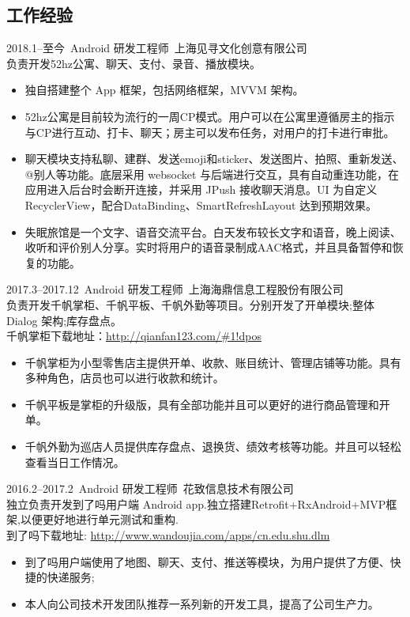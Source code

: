 \documentclass[11pt]{res}
\begin{document}
\begin{resume}
\section{工作经验}
  2018.1--至今\ Android 研发工程师\ 上海见寻文化创意有限公司\\负责开发52hz公寓、聊天、支付、录音、播放模块。
  \begin{itemize}
    \item 独自搭建整个 App 框架，包括网络框架，MVVM 架构。 
    \item 52hz公寓是目前较为流行的一周CP模式。用户可以在公寓里遵循房主的指示与CP进行互动、打卡、聊天；房主可以发布任务，对用户的打卡进行审批。
    \item 聊天模块支持私聊、建群、发送emoji和sticker、发送图片、拍照、重新发送、@别人等功能。底层采用 websocket 与后端进行交互，具有自动重连功能，在应用进入后台时会断开连接，并采用 JPush 接收聊天消息。UI 为自定义 RecyclerView，配合DataBinding、SmartRefreshLayout 达到预期效果。
    \item 失眠旅馆是一个文字、语音交流平台。白天发布较长文字和语音，晚上阅读、收听和评价别人分享。实时将用户的语音录制成AAC格式，并且具备暂停和恢复的功能。
  \end{itemize}
  2017.3--2017.12\ Android 研发工程师\ 上海海鼎信息工程股份有限公司\\负责开发千帆掌柜、千帆平板、千帆外勤等项目。分别开发了开单模块;整体 Dialog 架构;库存盘点。\\千帆掌柜下载地址：\url{http://qianfan123.com/#1!dpos}
  \begin{itemize}
    \item 千帆掌柜为小型零售店主提供开单、收款、账目统计、管理店铺等功能。具有多种角色，店员也可以进行收款和统计。
    \item 千帆平板是掌柜的升级版，具有全部功能并且可以更好的进行商品管理和开单。
    \item 千帆外勤为巡店人员提供库存盘点、退换货、绩效考核等功能。并且可以轻松查看当日工作情况。
  \end{itemize}
  2016.2--2017.2\ Android 研发工程师\ 花致信息技术有限公司\\独立负责开发到了吗用户端 Android app.独立搭建Retrofit+RxAndroid+MVP框架,以便更好地进行单元测试和重构.\\到了吗下载地址: \url{http://www.wandoujia.com/apps/cn.edu.shu.dlm}
  \begin{itemize}
    \item 到了吗用户端使用了地图、聊天、支付、推送等模块，为用户提供了方便、快捷的快递服务;
    \item 本人向公司技术开发团队推荐一系列新的开发工具，提高了公司生产力。
  \end{itemize}

\end{resume}
\end{document}
